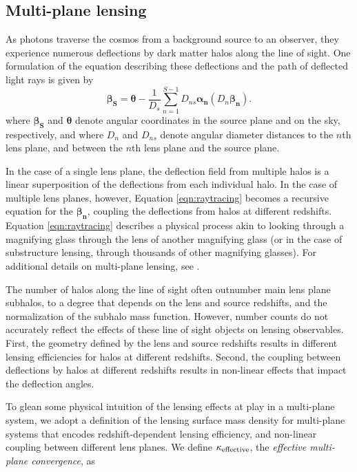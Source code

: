 \subsection{Multi-plane lensing}
\label{ssec:multplane}
As photons traverse the cosmos from a background source to an observer, they experience numerous deflections by dark matter halos along the line of sight. One formulation of the equation describing these deflections and the path of deflected light rays is given by \citep{Schnedier1997}
\begin{equation}
\label{eqn:raytracing}
\boldsymbol{\beta_S} = \boldsymbol{\theta} - \frac{1}{D_s} \sum_{n=1}^{S-1} D_{ns}{\boldsymbol{\alpha_n}} \left(D_n \boldsymbol{\beta_n}\right).
\end{equation}
where $\boldsymbol{\beta_S}$ and $\boldsymbol{\theta}$ denote angular coordinates in the source plane and on the sky, respectively, and where $D_n$ and $D_{ns}$ denote angular diameter distances to the $n$th lens plane, and between the $n$th lens plane and the source plane. 

In the case of a single lens plane, the deflection field from multiple halos is a linear superposition of the deflections from each individual halo. In the case of multiple lens planes, however, Equation \ref{eqn:raytracing} becomes a recursive equation for the $\boldsymbol{\beta_n}$, coupling the deflections from halos at different redshifts. Equation \ref{eqn:raytracing} describes a physical process akin to looking through a magnifying glass through the lens of another magnifying glass (or in the case of substructure lensing, through thousands of other magnifying glasses). For additional details on multi-plane lensing, see \citet{Schneider++92}. 

The number of halos along the line of sight often outnumber main lens plane subhalos, to a degree that depends on the lens and source redshifts, and the normalization of the subhalo mass function. However, number counts do not accurately reflect the effects of these line of sight objects on lensing observables. First, the geometry defined by the lens and source redshifts results in different lensing efficiencies for halos at different redshifts. Second, the coupling between deflections by halos at different redshifts results in non-linear effects that impact the deflection angles. 

To glean some physical intuition of the lensing effects at play in a multi-plane system, we adopt a definition of the lensing surface mass density for multi-plane systems that encodes redshift-dependent lensing efficiency, and non-linear coupling between different lens planes. We define $\kappa_{\rm{effective}}$, the \textit{effective multi-plane convergence}, as

